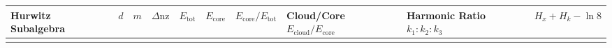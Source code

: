 \documentclass[
  a4paper,
]{article}
\newcounter{none} %
\begin{document}
{\def\LTcaptype{none} %
\begin{longtable}[]{@{}
  >{\raggedright\arraybackslash}p{}
  >{\centering\arraybackslash}p{}
  >{\centering\arraybackslash}p{}
  >{\centering\arraybackslash}p{}
  >{\centering\arraybackslash}p{}
  >{\centering\arraybackslash}p{}
  >{\centering\arraybackslash}p{}
  >{\centering\arraybackslash}p{}
  >{\centering\arraybackslash}p{}
  >{\centering\arraybackslash}p{}@{}}
\toprule\noalign{}
\begin{minipage}[b]{\linewidth}\raggedright
Hurwitz Subalgebra
\end{minipage} & \begin{minipage}[b]{\linewidth}\centering
\(d\)
\end{minipage} & \begin{minipage}[b]{\linewidth}\centering
\(m\)
\end{minipage} & \begin{minipage}[b]{\linewidth}\centering
\(\Delta\mathrm{nz}\)
\end{minipage} & \begin{minipage}[b]{\linewidth}\centering
\(E_{\mathrm{tot}}\)
\end{minipage} & \begin{minipage}[b]{\linewidth}\centering
\(E_{\mathrm{core}}\)
\end{minipage} & \begin{minipage}[b]{\linewidth}\centering
\(E_{\mathrm{core}}/E_{\mathrm{tot}}\)
\end{minipage} & \begin{minipage}[b]{\linewidth}\centering
\textbf{Cloud/Core \(E_{\mathrm{cloud}}/E_{\mathrm{core}}\)}
\end{minipage} & \begin{minipage}[b]{\linewidth}\centering
\textbf{Harmonic Ratio \(k_1:k_2:k_3\)}
\end{minipage} & \begin{minipage}[b]{\linewidth}\centering
\(H_x+H_k-\ln 8\)
\end{minipage} \\
\midrule\noalign{}

\end{longtable}}
\end{document}
